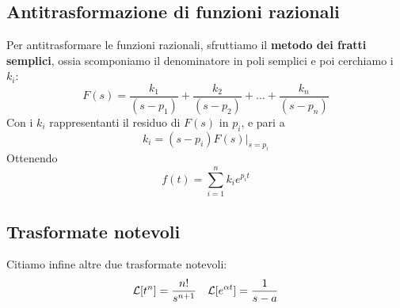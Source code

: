 \documentclass[11pt]{article}
\begin{document}
\subsection{Antitrasformazione di funzioni razionali}
Per antitrasformare le funzioni razionali, sfruttiamo il \textbf{metodo dei fratti semplici}, ossia scomponiamo il denominatore in poli semplici e poi cerchiamo i $k_i$:
\begin{displaymath}
    F(s) = \frac{k_1}{(s-p_1)}+\frac{k_2}{(s-p_2)}+...+\frac{k_n}{(s-p_n)}
\end{displaymath}
Con i $k_i$ rappresentanti il residuo di $F(s)$ in $p_i$, e pari a
\begin{displaymath}
    k_i= (s-p_i)F(s)|_{s=p_i}
\end{displaymath}
Ottenendo
\begin{displaymath}
    f(t) = \sum_{i=1}^n k_i e^{p_it}
\end{displaymath}
\subsection{Trasformate notevoli}
Citiamo infine altre due trasformate notevoli:
\begin{displaymath}
    \mathcal{L}[t^n] = \frac{n!}{s^{n+1}} \hspace{10px} \mathcal{L}[e^{\alpha t}] = \frac{1}{s-a}
\end{displaymath}
\end{document}
